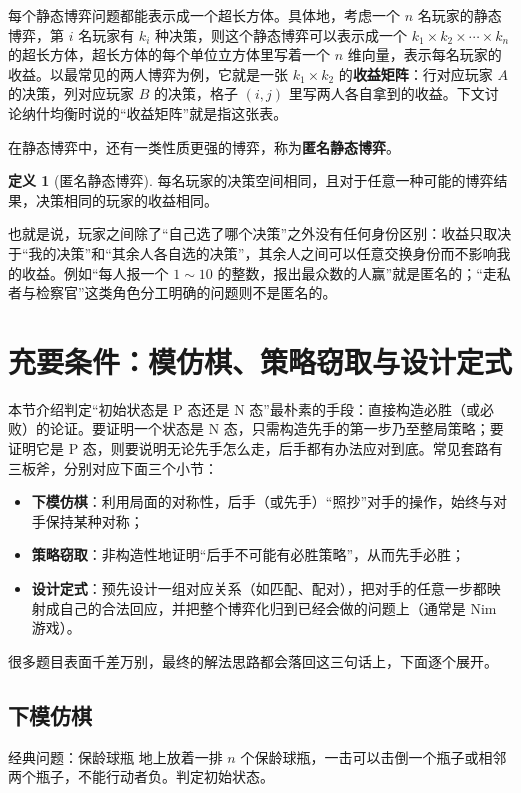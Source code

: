 \documentclass[UTF8,a4paper,11pt,oneside,openany,fontset=fandol]{ctexbook}
\theoremstyle{definition}
\newtheorem{definition}{定义}[chapter]
\begin{document}
每个静态博弈问题都能表示成一个超长方体。具体地，考虑一个 $n$ 名玩家的静态博弈，第 $i$ 名玩家有 $k_i$ 种决策，则这个静态博弈可以表示成一个 $k_1\times k_2\times\cdots\times k_n$ 的超长方体，超长方体的每个单位立方体里写着一个 $n$ 维向量，表示每名玩家的收益。以最常见的两人博弈为例，它就是一张 $k_1\times k_2$ 的\textbf{收益矩阵}：行对应玩家 $A$ 的决策，列对应玩家 $B$ 的决策，格子 $(i,j)$ 里写两人各自拿到的收益。下文讨论纳什均衡时说的“收益矩阵”就是指这张表。

在静态博弈中，还有一类性质更强的博弈，称为\textbf{匿名静态博弈}。
\begin{definition}[匿名静态博弈]
每名玩家的决策空间相同，且对于任意一种可能的博弈结果，决策相同的玩家的收益相同。
\end{definition}
也就是说，玩家之间除了“自己选了哪个决策”之外没有任何身份区别：收益只取决于“我的决策”和“其余人各自选的决策”，其余人之间可以任意交换身份而不影响我的收益。例如“每人报一个 $1\sim10$ 的整数，报出最众数的人赢”就是匿名的；“走私者与检察官”这类角色分工明确的问题则不是匿名的。

\chapter{充要条件：模仿棋、策略窃取与设计定式}
本节介绍判定“初始状态是 P 态还是 N 态”最朴素的手段：直接构造必胜（或必败）的论证。要证明一个状态是 N 态，只需构造先手的第一步乃至整局策略；要证明它是 P 态，则要说明无论先手怎么走，后手都有办法应对到底。常见套路有三板斧，分别对应下面三个小节：
\begin{itemize}
\item \textbf{下模仿棋}：利用局面的对称性，后手（或先手）“照抄”对手的操作，始终与对手保持某种对称；
\item \textbf{策略窃取}：非构造性地证明“后手不可能有必胜策略”，从而先手必胜；
\item \textbf{设计定式}：预先设计一组对应关系（如匹配、配对），把对手的任意一步都映射成自己的合法回应，并把整个博弈化归到已经会做的问题上（通常是 Nim 游戏）。
\end{itemize}
很多题目表面千差万别，最终的解法思路都会落回这三句话上，下面逐个展开。

\section{下模仿棋}
\begin{problem}{经典问题：保龄球瓶}
地上放着一排 $n$ 个保龄球瓶，一击可以击倒一个瓶子或相邻两个瓶子，不能行动者负。判定初始状态。
\end{problem}
\end{document}
